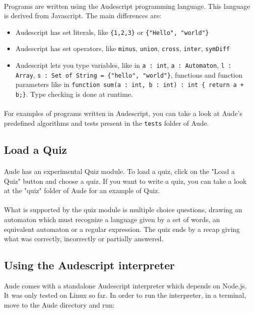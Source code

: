 \paragraph{}
Programs are written using the Audescript programming language. This language is derived from Javascript. The main differences are:

\begin{itemize}
	\item{Audescript has set literals, like \verb!{1,2,3}! or \verb!{"Hello", "world"}!}
	\item{Audescript has set operators, like \verb!minus!, \verb!union!, \verb!cross!, \verb!inter!, \verb!symDiff!}
	\item{Audescript lets you type variables, like in \verb!a : int!, \verb!a : Automaton!, \verb!l : Array!, \verb!s : Set of String = {"hello", "world"}!, functions and function parameters like in \verb!function sum(a : int, b : int) : int { return a + b;}!. Type checking is done at runtime.}
\end{itemize}

\paragraph{}
For examples of programs written in Audescript, you can take a look at Aude's predefined algorithms and tests present in the \verb!tests! folder of Aude.

\subsection{Load a Quiz}
\paragraph{}
Aude has an experimental Quiz module. To load a quiz, click on the "Load a Quiz" button and choose a quiz. If you want to write a quiz, you can take a look at the "quiz" folder of Aude for an example of Quiz.

\paragraph{}
What is supported by the quiz module is multiple choice questions, drawing an automaton which must recognize a language given by a set of words, an equivalent automaton or a regular expression. The quiz ends by a recap giving what was correctly, incorrectly or partially answered.

\subsection{Using the Audescript interpreter}
Aude comes with a standalone Audescript interpreter which depends on Node.js. It was only tested on Linux so far. In order to run the interpreter, in a terminal, move to the Aude directory and run:

